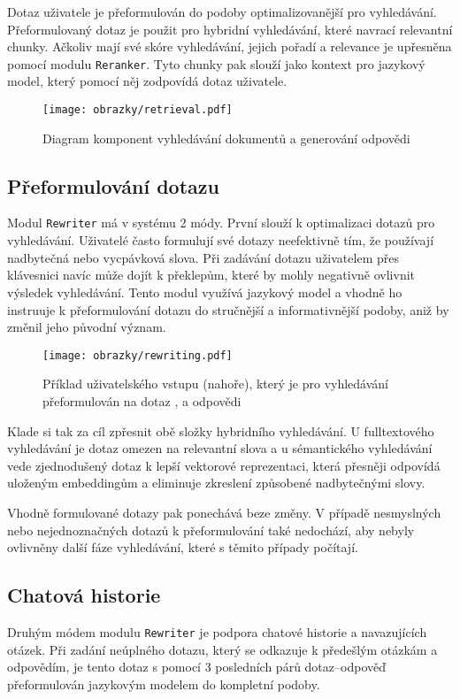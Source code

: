 Dotaz uživatele je přeformulován do podoby optimalizovanější pro vyhledávání. Přeformulovaný dotaz je použit pro hybridní vyhledávání, které navrací relevantní chunky. Ačkoliv mají své skóre vyhledávání, jejich pořadí a relevance je upřesněna pomocí modulu \texttt{Reranker}. Tyto chunky pak slouží jako kontext pro jazykový model, který pomocí něj zodpovídá dotaz uživatele.

\begin{figure}[H]
    \centering
    \texttt{[image: obrazky/retrieval.pdf]}
    \caption{Diagram komponent vyhledávání dokumentů a generování odpovědi}
    \label{fig:retrieval}
\end{figure}

\subsection{Přeformulování dotazu}
Modul \texttt{Rewriter} má v systému 2 módy. První slouží k optimalizaci dotazů pro vyhledávání. Uživatelé často formulují své dotazy neefektivně tím, že používají nadbytečná nebo vycpávková slova. Při zadávání dotazu uživatelem přes klávesnici navíc může dojít k překlepům, které by mohly negativně ovlivnit výsledek vyhledávání. Tento modul využívá jazykový model a vhodně ho instruuje k přeformulování dotazu do stručnější a informativnější podoby, aniž by změnil jeho původní význam.

\begin{figure}[H]
    \centering
    \texttt{[image: obrazky/rewriting.pdf]}
    \caption{Příklad uživatelského vstupu (nahoře), který je pro vyhledávání přeformulován na dotaz , a odpovědi}
    \label{fig:rewriting}
\end{figure}

Klade si tak za cíl zpřesnit obě složky hybridního vyhledávání. U fulltextového vyhledávání je dotaz omezen na relevantní slova a u sémantického vyhledávání vede zjednodušený dotaz k lepší vektorové reprezentaci, která přesněji odpovídá uloženým embeddingům a eliminuje zkreslení způsobené nadbytečnými slovy.



Vhodně formulované dotazy pak ponechává beze změny. V případě nesmyslných nebo nejednoznačných dotazů k přeformulování také nedochází, aby nebyly ovlivněny další fáze vyhledávání, které s těmito případy počítají.

\subsection{Chatová historie}
Druhým módem modulu \texttt{Rewriter} je podpora chatové historie a navazujících otázek. Při zadání neúplného dotazu, který se odkazuje k předešlým otázkám a odpovědím, je tento dotaz s pomocí 3 posledních párů dotaz–odpověď přeformulován jazykovým modelem do kompletní podoby.

